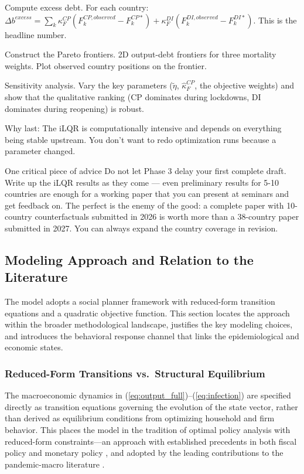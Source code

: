 \documentclass[12pt, a4paper]{article}
\begin{document}
Compute excess debt. For each country: $\Delta b^{excess} = \sum_k \kappa_F^{CP}(F_k^{CP,observed} - F_k^{CP*}) + \kappa_F^{DI}(F_k^{DI,observed} - F_k^{DI*})$. This is the headline number.

Construct the Pareto frontiers. 2D output-debt frontiers for three mortality weights. Plot observed country positions on the frontier.

Sensitivity analysis. Vary the key parameters ($\tilde{\eta}$, $\hat{\kappa}_F^{CP}$, the objective weights) and show that the qualitative ranking (CP dominates during lockdowns, DI dominates during reopening) is robust.

Why last: The iLQR is computationally intensive and depends on everything being stable upstream. You don't want to redo optimization runs because a parameter changed.

One critical piece of advice
Do not let Phase 3 delay your first complete draft. Write up the iLQR results as they come — even preliminary results for 5-10 countries are enough for a working paper that you can present at seminars and get feedback on. The perfect is the enemy of the good: a complete paper with 10-country counterfactuals submitted in 2026 is worth more than a 38-country paper submitted in 2027. You can always expand the country coverage in revision.

\subsection{Modeling Approach and Relation to the Literature}
\label{sec:modeling_approach}

The model adopts a social planner framework with reduced-form transition equations and a quadratic objective function. This section locates the approach within the broader methodological landscape, justifies the key modeling choices, and introduces the behavioral response channel that links the epidemiological and economic states.
\subsubsection*{Reduced-Form Transitions vs.\ Structural Equilibrium}

The macroeconomic dynamics in (\ref{eq:output_full})--(\ref{eq:infection}) are specified directly as transition equations governing the evolution of the state vector, rather than derived as equilibrium conditions from optimizing household and firm behavior. This places the model in the tradition of optimal policy analysis with reduced-form constraints---an approach with established precedents in both fiscal policy \citep{barro1999} and monetary policy \citep{svensson1999}, and adopted by the leading contributions to the pandemic-macro literature \citep{alvarez2020, acemoglu2021}.
\end{document}
